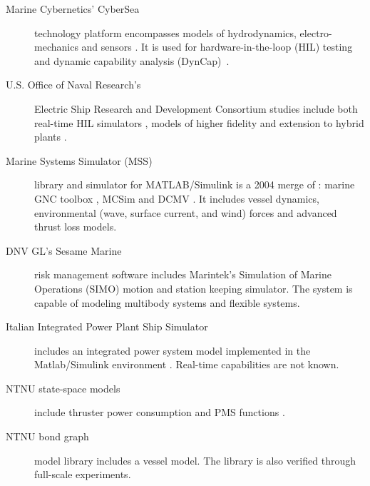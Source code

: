 \documentclass[twocolumn,10pt]{asme2e}
\begin{document}
\begin{description}
\item[Marine Cybernetics' CyberSea] technology platform encompasses models of hydrodynamics, electro-mechanics
and sensors \cite{MarineCybernetics2014}. It is used for hardware-in-the-loop
(HIL) testing~\cite{Johansen2009} and dynamic capability analysis (DynCap)~\cite{Pivano2014}.


\item[U.S. Office of Naval Research's] Electric Ship Research and Development Consortium studies include both real-time HIL simulators \cite{RenSteurerWoodruff2005}, models of higher fidelity \cite{SteurerAndrusLangstonQiSuryanarayananWoodruffRibeiro2007} and extension to hybrid plants \cite{Xie2010}.

\item[Marine Systems Simulator (MSS)] \cite{MSS2010} library and simulator for MATLAB/Simulink is a 2004 merge of \cite[Sec. 1]{MSS}: marine GNC toolbox \cite{Fossen2002},
MCSim \cite{SorensenPedersenSmogeli2003} and DCMV \cite{PerezBlanke2003}.
It includes vessel dynamics, environmental (wave, surface current,
and wind) forces and advanced thrust loss models.

\item[DNV GL's Sesame Marine] \cite{DNV2014} risk management software includes Marintek's
Simulation of Marine Operations (SIMO) motion and station keeping
simulator. The system is capable of modeling multibody systems and
flexible systems. %

\item[Italian Integrated Power Plant Ship Simulator] includes an integrated
power system model implemented in the Matlab/Simulink environment \cite{BosichFilippoGiulivoSulligoiTessarolo2012}. Real-time capabilities are not known.

\item[NTNU state-space models]
include thruster power consumption \cite{Hansen2000} and PMS functions \cite{Radan2008}.

\item[NTNU bond graph]
model library \cite{Pedersen2009} includes a vessel model. The library is also verified through full-scale experiments.
\end{description}
\end{document}
